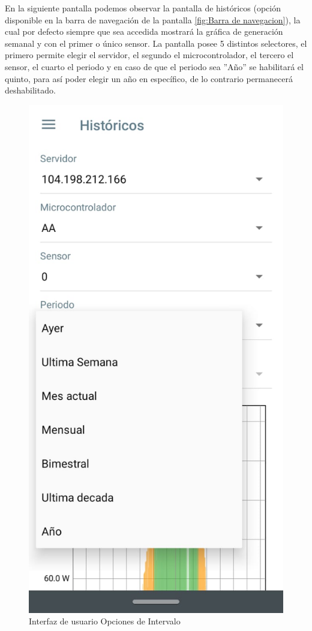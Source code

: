 En la siguiente pantalla podemos observar la pantalla de históricos (opción disponible en la barra de navegación de la pantalla \ref{fig:Barra de navegacion}), la cual por defecto siempre que sea accedida mostrará la gráfica de generación semanal y con el primer o único sensor. La pantalla posee 5 distintos selectores, el primero permite elegir el servidor, el segundo el microcontrolador, el tercero el sensor, el cuarto el periodo y en caso de que el periodo sea ''Año'' se habilitará el quinto, para así poder elegir un año en específico, de lo contrario permanecerá deshabilitado.

\begin{figure}[H]
	\centering
	\includegraphics[scale=0.4]{Capitulo4/software/submodulos/images/man34.png}
	\caption{Interfaz de usuario Opciones de Intervalo}
	\label{fig:Opciones de Intervalo}
\end{figure}

